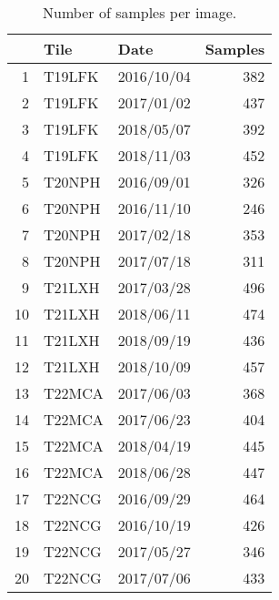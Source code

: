 \begin{table}[ht]
\centering
\begin{tabular}{rllr}
  \hline
 & Tile & Date & Samples \\ 
  \hline
1 & T19LFK & 2016/10/04 & 382 \\ 
  2 & T19LFK & 2017/01/02 & 437 \\ 
  3 & T19LFK & 2018/05/07 & 392 \\ 
  4 & T19LFK & 2018/11/03 & 452 \\ 
  5 & T20NPH & 2016/09/01 & 326 \\ 
  6 & T20NPH & 2016/11/10 & 246 \\ 
  7 & T20NPH & 2017/02/18 & 353 \\ 
  8 & T20NPH & 2017/07/18 & 311 \\ 
  9 & T21LXH & 2017/03/28 & 496 \\ 
  10 & T21LXH & 2018/06/11 & 474 \\ 
  11 & T21LXH & 2018/09/19 & 436 \\ 
  12 & T21LXH & 2018/10/09 & 457 \\ 
  13 & T22MCA & 2017/06/03 & 368 \\ 
  14 & T22MCA & 2017/06/23 & 404 \\ 
  15 & T22MCA & 2018/04/19 & 445 \\ 
  16 & T22MCA & 2018/06/28 & 447 \\ 
  17 & T22NCG & 2016/09/29 & 464 \\ 
  18 & T22NCG & 2016/10/19 & 426 \\ 
  19 & T22NCG & 2017/05/27 & 346 \\ 
  20 & T22NCG & 2017/07/06 & 433 \\ 
   \hline
\end{tabular}
\caption{Number of samples per image.} 
\end{table}
